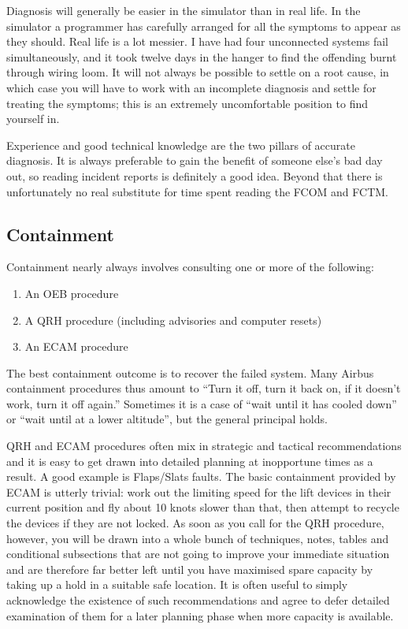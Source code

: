 \documentclass[a5paper,11pt,titlepage]{article}
\begin{document}
Diagnosis will generally be easier in the simulator than in real
life. In the simulator a programmer has carefully arranged for all the
symptoms to appear as they should. Real life is a lot messier. I have
had four unconnected systems fail simultaneously, and it took twelve
days in the hanger to find the offending burnt through wiring loom. It
will not always be possible to settle on a root cause, in which case you
will have to work with an incomplete diagnosis and settle for treating
the symptoms; this is an extremely uncomfortable position to find
yourself in.

Experience and good technical knowledge are the two pillars of accurate
diagnosis. It is always preferable to gain the benefit of someone else's
bad day out, so reading incident reports is definitely a good
idea. Beyond that there is unfortunately no real substitute for time
spent reading the FCOM and FCTM.

\subsection{Containment}

Containment nearly always involves consulting one or more of the
following:

\begin{enumerate}
\item An OEB procedure
\item A QRH procedure (including advisories and computer resets)
\item An ECAM procedure
\end{enumerate}

The best containment outcome is to recover the failed system. Many
Airbus containment procedures thus amount to ``Turn it off, turn it back
on, if it doesn't work, turn it off again.'' Sometimes it is a case of
``wait until it has cooled down'' or ``wait until at a lower altitude'',
but the general principal holds.

QRH and ECAM procedures often mix in strategic and tactical
recommendations and it is easy to get drawn into detailed planning at
inopportune times as a result. A good example is Flaps/Slats faults. The
basic containment provided by ECAM is utterly trivial: work out the
limiting speed for the lift devices in their current position and fly
about 10 knots slower than that, then attempt to recycle the devices if
they are not locked. As soon as you call for the QRH procedure, however,
you will be drawn into a whole bunch of techniques, notes, tables and
conditional subsections that are not going to improve your immediate
situation and are therefore far better left until you have maximised
spare capacity by taking up a hold in a suitable safe location. It is
often useful to simply acknowledge the existence of such recommendations
and agree to defer detailed examination of them for a later planning
phase when more capacity is available.
\end{document}
